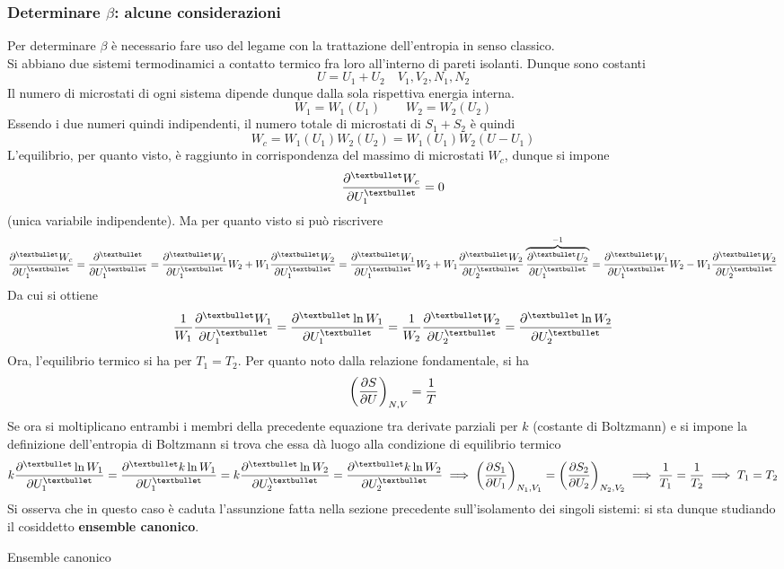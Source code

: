 \documentclass[10pt, oneside]{book}
\begin{document}
\subsubsection*{Determinare $\beta$: alcune considerazioni}
Per determinare $\beta$ è necessario fare uso del legame con la trattazione dell'entropia in senso classico.\\
Si abbiano due sistemi termodinamici a contatto termico fra loro all'interno di pareti isolanti. Dunque sono costanti
\[U = U_1 + U_2 \quad V_1, V_2, N_1, N_2\]
Il numero di microstati di ogni sistema dipende dunque dalla sola rispettiva energia interna.
\[W_1 = W_1(U_1) \qquad W_2 = W_2(U_2)\]
Essendo i due numeri quindi indipendenti, il numero totale di microstati di $S_1 + S_2$ è quindi
\[W_c = W_1 (U_1) W_2(U_2) = W_1(U_1) W_2(U - U_1)\]
L'equilibrio, per quanto visto, è raggiunto in corrispondenza del massimo di microstati $W_c$, dunque si impone
\[\pdv[•]{W_c}{U_1} = 0\]
(unica variabile indipendente). Ma per quanto visto si può riscrivere
\[\pdv[•]{W_c}{U_1} = \pdv[•]{}{U_1}(W_1 \cdot W_2) = \pdv[•]{W_1}{U_1} W_2 + W_1 \pdv[•]{W_2}{U_1} = \pdv[•]{W_1}{U_1} W_2 + W_1 \pdv[•]{W_2}{U_2}\overbrace{\pdv[•]{U_2}{U_1}}^{-1} = \pdv[•]{W_1}{U_1} W_2 - W_1 \pdv[•]{W_2}{U_2}\]
Da cui si ottiene
\[\frac{1}{W_1} \pdv[•]{W_1}{U_1} = \pdv[•]{\ln W_1}{U_1} = \frac{1}{W_2} \pdv[•]{W_2}{U_2} = \pdv[•]{\ln W_2}{U_2}\]
Ora, l'equilibrio termico si ha per $T_1 = T_2$. Per quanto noto dalla relazione fondamentale, si ha
\[\bigg(\pdv{S}{U}\bigg)_{N,V} = \frac{1}{T}\]
Se ora si moltiplicano entrambi i membri della precedente equazione tra derivate parziali per $k$ (costante di Boltzmann) e si impone la definizione dell'entropia di Boltzmann si trova che essa dà luogo alla condizione di equilibrio termico
\[k \pdv[•]{\ln W_1}{U_1} = \pdv[•]{k\ln W_1}{U_1} = k \pdv[•]{\ln W_2}{U_2} = \pdv[•]{k\ln W_2}{U_2} \implies \bigg(\pdv{S_1}{U_1}\bigg)_{N_1, V_1} = \bigg(\pdv{S_2}{U_2}\bigg)_{N_2, V_2} \implies \frac{1}{T_1} = \frac{1}{T_2} \implies T_1 = T_2\]
Si osserva che in questo caso è caduta l'assunzione fatta nella sezione precedente sull'isolamento dei singoli sistemi: si sta dunque studiando il cosiddetto \textbf{ensemble canonico}.
\begin{description}
\item[Ensemble canonico] 
\end{description}
\end{document}
